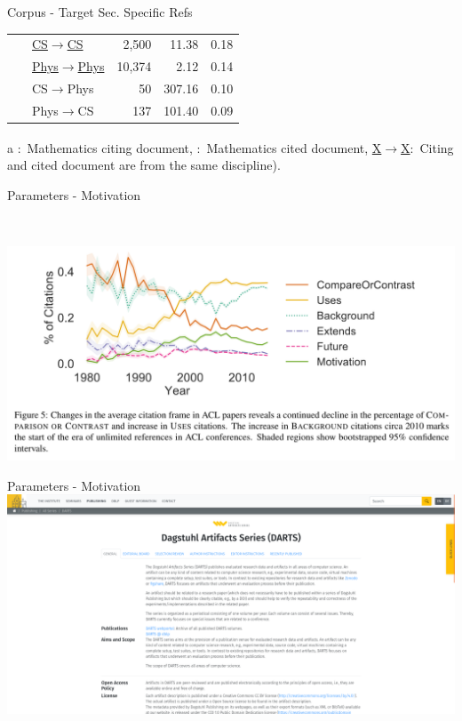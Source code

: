 \documentclass[en,16:9,smallfoot]{sdqbeamer}
\begin{document}
\begin{frame}{Corpus - Target Sec. Specific Refs}
\begin{table}
\begin{scriptsize}
\begin{threeparttable}
\begin{tabular}{llrrr}
       \ & \underline{CS$\rightarrow$CS} & 2,500 & 11.38 & 0.18 \\ %
       \ & \underline{Phys$\rightarrow$Phys} & 10,374 & 2.12 & 0.14 \\ %
       \ & CS$\rightarrow$Phys & 50 & 307.16 & 0.10 \\ %
       \ & Phys$\rightarrow$CS & 137 & 101.40 & 0.09  \\ %
      \bottomrule
    \end{tabular}
     \begin{tablenotes}
        \item[a] \textsuperscript{\textdagger}:~Mathematics citing document, \textsuperscript{\textdaggerdbl}:~Mathematics cited document, \underline{X$\rightarrow$X}:~Citing and cited document are from the same discipline).
      \end{tablenotes}
     \end{threeparttable}
    \end{scriptsize}
    \end{table}
   \end{frame}

   \begin{frame}{Parameters - Motivation}
    \begin{scriptsize}
    \\
    \end{scriptsize}

    \centering
    \includegraphics[width=.7\textwidth]{imgs/use_on_the_rise}
   \end{frame}

   \begin{frame}{Parameters - Motivation}
    \centering
    \includegraphics[width=.8\textwidth]{imgs/darts_website}
   \end{frame}
\end{document}
